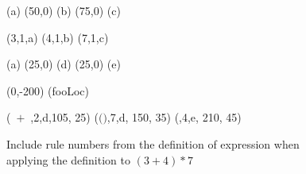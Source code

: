 



\begin {figure}

\Draw


\MarkLoc(a)
\Move(50,0)
\MarkLoc(b)
\Move(75,0)
\MarkLoc(c)

\boxItDefault(3,1,a)
\boxItDefault(4,1,b)
\boxItDefault(7,1,c)

\MoveToLoc(a)
\Move(25,0)
\MarkLoc(d)
\Move(25,0)
\MarkLoc(e)

\Move(0,-200)
\MarkLoc(fooLoc)


\boxIt(~$  +  $~,2,d,105, 25)
\boxIt($($\hspace{0.8in}\hfill\hspace{0.8in}$)$,7,d, 150, 35)
\boxIt(\hspace{135pt}\hfill*\hspace{20pt},4,e, 210, 45)

\EndDraw


\caption {Include rule numbers from the definition of expression 
when applying the definition to $(3+4)*7$ }
\label {fig:exprsBoxed}

\end {figure}


